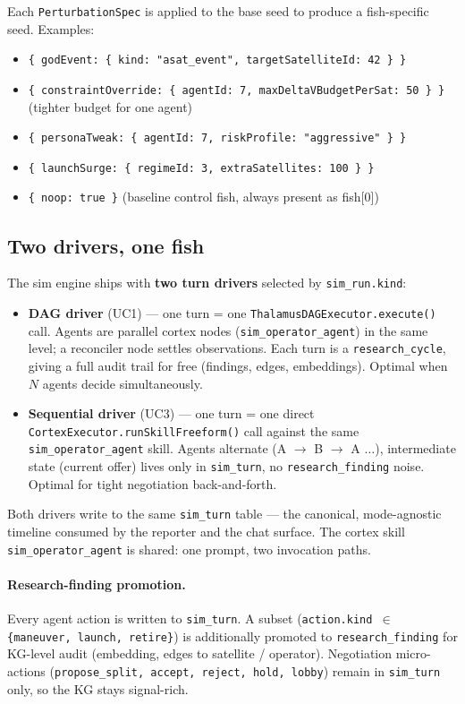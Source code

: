 Each \texttt{PerturbationSpec} is applied to the base seed to produce a fish-specific seed. Examples:
\begin{itemize}[leftmargin=1.2em]
  \item \texttt{\{ godEvent: \{ kind: "asat\_event", targetSatelliteId: 42 \} \}}
  \item \texttt{\{ constraintOverride: \{ agentId: 7, maxDeltaVBudgetPerSat: 50 \} \}} (tighter budget for one agent)
  \item \texttt{\{ personaTweak: \{ agentId: 7, riskProfile: "aggressive" \} \}}
  \item \texttt{\{ launchSurge: \{ regimeId: 3, extraSatellites: 100 \} \}}
  \item \texttt{\{ noop: true \}} (baseline control fish, always present as fish[0])
\end{itemize}

\subsection{Two drivers, one fish}
The sim engine ships with \textbf{two turn drivers} selected by \texttt{sim\_run.kind}:

\begin{itemize}[leftmargin=1.2em]
  \item \textbf{DAG driver} (UC1) --- one turn = one \texttt{ThalamusDAGExecutor.execute()} call. Agents are parallel cortex nodes (\texttt{sim\_operator\_agent}) in the same level; a reconciler node settles observations. Each turn is a \texttt{research\_cycle}, giving a full audit trail for free (findings, edges, embeddings). Optimal when $N$ agents decide simultaneously.
  \item \textbf{Sequential driver} (UC3) --- one turn = one direct \texttt{CortexExecutor.runSkillFreeform()} call against the same \texttt{sim\_operator\_agent} skill. Agents alternate (A $\to$ B $\to$ A $\ldots$), intermediate state (current offer) lives only in \texttt{sim\_turn}, no \texttt{research\_finding} noise. Optimal for tight negotiation back-and-forth.
\end{itemize}

Both drivers write to the same \texttt{sim\_turn} table --- the canonical, mode-agnostic timeline consumed by the reporter and the chat surface. The cortex skill \texttt{sim\_operator\_agent} is shared: one prompt, two invocation paths.

\paragraph{Research-finding promotion.} Every agent action is written to \texttt{sim\_turn}. A subset (\texttt{action.kind $\in$ \{maneuver, launch, retire\}}) is additionally promoted to \texttt{research\_finding} for KG-level audit (embedding, edges to satellite / operator). Negotiation micro-actions (\texttt{propose\_split, accept, reject, hold, lobby}) remain in \texttt{sim\_turn} only, so the KG stays signal-rich.

